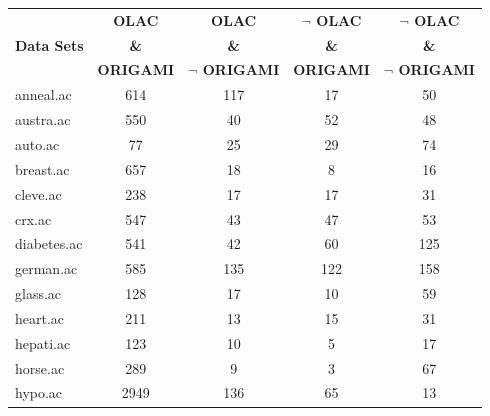 \begin{table}[htbp]
	\centering
		\begin{tabular}{|l|c|c|c|c|}
		\hline
				& \textbf{OLAC}		& \textbf{OLAC}			& \textbf{$\neg$ OLAC}	& \textbf{$\neg$ OLAC}	\\
		\textbf{Data Sets}	& \textbf{\&}		& \textbf{\&}			& \textbf{\&}			& \textbf{\&}			\\
				& \textbf{ORIGAMI}	& \textbf{$\neg$ ORIGAMI}	& \textbf{ORIGAMI}		& \textbf{$\neg$ ORIGAMI}	\\
		\hline
		anneal.ac       & 614           & 117                & 17                       & 50                            \\
		\hline
		austra.ac       & 550           & 40                 & 52                       & 48                            \\
		\hline
		auto.ac         & 77            & 25                 & 29                       & 74                            \\
		\hline
		breast.ac       & 657           & 18                 & 8                        & 16                            \\
		\hline
		cleve.ac        & 238           & 17                 & 17                       & 31                            \\
		\hline
		crx.ac          & 547           & 43                 & 47                       & 53                            \\
		\hline
		diabetes.ac     & 541           & 42                 & 60                       & 125                           \\
		\hline
		german.ac       & 585           & 135                & 122                      & 158                           \\
		\hline
		glass.ac        & 128           & 17                 & 10                       & 59                            \\
		\hline
		heart.ac        & 211           & 13                 & 15                       & 31                            \\
		\hline
		hepati.ac       & 123           & 10                 & 5                        & 17                            \\
		\hline
		horse.ac        & 289           & 9                  & 3                        & 67                            \\
		\hline
		hypo.ac         & 2949          & 136                & 65                       & 13                            \\

\end{tabular}
\end{table}
